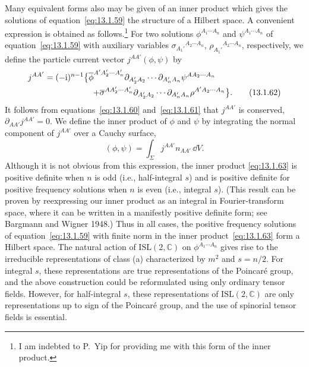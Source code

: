 Many equivalent forms also may be given of an inner product which gives the solutions
of equation~\eqref{eq:13.1.59} the structure of a Hilbert space. A convenient
expression is obtained as follows.\footnote{I am indebted to P.~Yip for providing me
with this form of the inner product.} For two solutions
\(\phi^{A_1\cdots A_n}\) and \(\psi^{A_1\cdots A_n}\) of
equation~\eqref{eq:13.1.59} with auxiliary variables
\(\sigma_{A_1'}{}^{A_2\cdots A_n}\),
\(\rho_{A_1'}{}^{A_2\cdots A_n}\), respectively, we define the particle current
vector \(j^{AA'}(\phi,\psi)\) by
\begin{align}
  j^{AA'}={}&(-\ii)^{n-1}\bigl\{
  \overline\phi^{A'A_2'\cdots A_n'}
  \partial_{A_2'A_2}\cdots\partial_{A_n'A_n}
  \psi^{AA_2\cdots A_n}\notag\\
  &\mathrel{\phantom{(-\ii)^{n-1}\bigl\{}}+
  \overline\sigma^{AA_2'\cdots A_n'}
  \partial_{A_2'A_2}\cdots\partial_{A_n'A_n}
  \rho^{A'A_2\cdots A_n}\bigr\}.
  \tag{13.1.62}\label{eq:13.1.62}
\end{align}
It follows from equations~\eqref{eq:13.1.60} and~\eqref{eq:13.1.61} that
\(j^{AA'}\) is conserved, \(\partial_{AA'}j^{AA'}=0\). We define the inner product
of \(\phi\) and \(\psi\) by integrating the normal component of \(j^{AA'}\) over a
Cauchy surface,
\begin{equation}
  (\phi,\psi)=\int_\Sigma j^{AA'}n_{AA'}\,\dd V.
  \tag{13.1.63}\label{eq:13.1.63}
\end{equation}
Although it is not obvious from this expression, the inner product
\eqref{eq:13.1.63} is positive definite when \(n\) is odd (i.e., half-integral
\(s\)) and is positive definite for positive frequency solutions when \(n\) is even
(i.e., integral \(s\)). (This result can be proven by reexpressing our inner product
as an integral in Fourier-transform space, where it can be written in a manifestly
positive definite form; see Bargmann and Wigner 1948.) Thus in all cases, the
positive frequency solutions of equation~\eqref{eq:13.1.59} with finite norm in the
inner product~\eqref{eq:13.1.63} form a Hilbert space. The natural action of
\(\mathrm{ISL}(2,\mathbb C)\) on \(\phi^{A_1\cdots A_n}\) gives rise to the
irreducible representations of class (a) characterized by \(m^2\) and \(s=n/2\).
For integral \(s\), these representations are true representations of the Poincar\'e
group, and the above construction could be reformulated using only ordinary tensor
fields. However, for half-integral \(s\), these representations of
\(\mathrm{ISL}(2,\mathbb C)\) are only representations up to sign of the Poincar\'e
group, and the use of spinorial tensor fields is essential.


